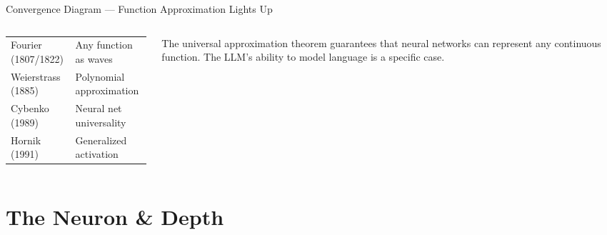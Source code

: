 \begin{frame}[shrink=5]{Convergence Diagram --- Function Approximation Lights Up}
  \vspace{0.3em}
  \begin{columns}[T]
    \begin{column}{0.48\textwidth}
      \begin{tcolorbox}[colback=aiViolet!5,colframe=aiViolet,
        fonttitle=\bfseries\small,title={Section 6 Summary},
        rounded corners,boxrule=0.8pt,left=3pt,right=3pt,top=3pt,bottom=3pt]
        \scriptsize
        \begin{tabular}{@{}ll@{}}
          Fourier (1807/1822) & Any function as waves\\
          Weierstrass (1885)  & Polynomial approximation\\
          Cybenko (1989)      & Neural net universality\\
          Hornik (1991)       & Generalized activation
        \end{tabular}
      \end{tcolorbox}
    \end{column}

    \begin{column}{0.48\textwidth}
      \begin{tcolorbox}[colback=accentOrange!8,colframe=accentOrange,
        fonttitle=\bfseries\small,
        title={\faArrowRight\ Connection to the Transformer},
        rounded corners,boxrule=0.8pt,left=3pt,right=3pt,top=3pt,bottom=3pt]
        \scriptsize
        The universal approximation theorem guarantees that neural networks
        can represent any continuous function. The LLM's ability to model
        language is a specific case.
      \end{tcolorbox}
    \end{column}
  \end{columns}

\end{frame}


\section{The Neuron \& Depth}


